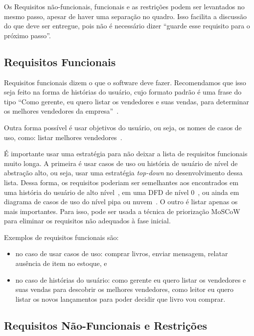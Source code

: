 \documentclass[fontsize=12pt, a4paper,pagesize=auto,toc=listof, ,twoside,chapterprefix=false,appendixprefix=true,open=right]{scrbook}
\begin{document}
Os Requisitos não-funcionais, funcionais e as restrições podem ser levantados no mesmo passo, apesar de haver uma separação no quadro.
Isso facilita a discussão do que deve ser entregue, pois não é necessário dizer ``guarde esse requisito para o próximo passo''.

\subsection{Requisitos Funcionais}

Requisitos funcionais dizem o que o software deve fazer.
Recomendamos que isso seja feito na forma de histórias do usuário, cujo formato padrão é uma frase do tipo ``Como gerente, eu quero listar os vendedores e suas vendas, para determinar os melhores vendedores da empresa''~\citep{mike:user:stories}.

Outra forma possível é usar objetivos do usuário, ou seja, os nomes de casos de uso, como: listar melhores vendedores~\citep{Cockburn2000}.

É importante usar uma estratégia para não deixar a lista de requisitos funcionais muito longa.
A primeira é usar casos de uso ou história de usuário de nível de abstração alto, ou seja, usar uma estratégia \textit{top-down} no desenvolvimento dessa lista.
Dessa forma, os requisitos poderiam ser semelhantes aos encontrados em uma história do usuário de alto nível~\citep{jacobson:2011:uc2p0}, em uma DFD de nível 0~\citep{gane:sarson:ssa}, ou ainda em diagrama de casos de uso do nível pipa ou nuvem~\citep{Cockburn2000}.
O outro é listar apenas os mais importantes. Para isso, pode ser usada a técnica de priorização MoSCoW~\citep{babok,dsdm:2nd} para eliminar os requisitos não adequados à fase inicial.

Exemplos de requisitos funcionais são:
\begin{itemize}
    \item no caso de usar casos de uso: comprar livros, enviar mensagem, relatar ausência de item no estoque, e
    \item no caso de histórias do usuário: como gerente eu quero listar os vendedores e suas vendas para descobrir os melhores vendedores, como leitor eu quero listar os novos lançamentos para poder decidir que livro vou comprar.
\end{itemize}

\subsection{Requisitos Não-Funcionais e Restrições}
\end{document}
